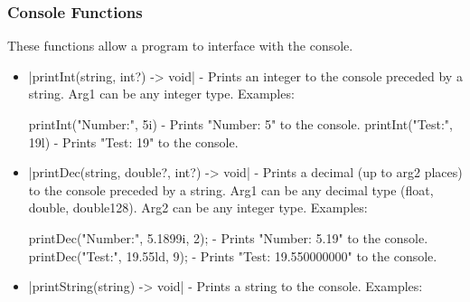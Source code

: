 \documentclass[12pt, letterpaper, oneside]{article}
\begin{document}
	\subsubsection{Console Functions}
	These functions allow a program to interface with the console.
	\begin{itemize}
		\item[--] \spverb|printInt(string, int?) -> void| - Prints an integer to the console preceded by a string. Arg1 can be any integer type. Examples: 
		
		
		\begin{spverbatim}
			printInt("Number:", 5i) - Prints "Number: 5" to the console.
			printInt("Test:", 19l) - Prints "Test: 19" to the console.
		\end{spverbatim}
		\item[--] \spverb|printDec(string, double?, int?) -> void| - Prints a decimal (up to arg2 places) to the console preceded by a string. Arg1 can be any decimal type (float, double, double128). Arg2 can be any integer type. Examples: 
		
		
		\begin{spverbatim}
			printDec("Number:", 5.1899i, 2); - Prints "Number: 5.19" to the console.
			printDec("Test:", 19.55ld, 9); - Prints "Test: 19.550000000" to the console.
		\end{spverbatim}
		\newpage 
		\item[--] \spverb|printString(string) -> void| - Prints a string to the console. Examples:
		

\end{itemize}
\end{document}
